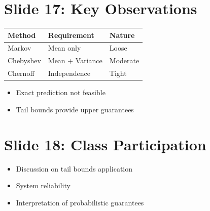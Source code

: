 \documentclass[12pt]{article}
\begin{document}
\section*{Slide 17: Key Observations}

\begin{center}
\begin{tabular}{lll}
\toprule
Method & Requirement & Nature \\
\midrule
Markov & Mean only & Loose \\
Chebyshev & Mean + Variance & Moderate \\
Chernoff & Independence & Tight \\
\bottomrule
\end{tabular}
\end{center}

\begin{itemize}
    \item Exact prediction not feasible
    \item Tail bounds provide upper guarantees
\end{itemize}

\section*{Slide 18: Class Participation}
\begin{itemize}
    \item Discussion on tail bounds application
    \item System reliability
    \item Interpretation of probabilistic guarantees
\end{itemize}
\end{document}
